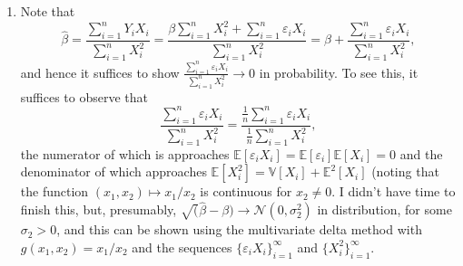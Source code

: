\documentclass[11pt]{article}
\newcommand{\E}{\mathbb{E}} %
\newcommand{\Var}{\mathbb{V}} %
\newcommand{\e}{\varepsilon} %
\begin{document}
\begin{enumerate}
\item Note that
\[\hat\beta
    = \frac{\sum_{i = 1}^n Y_iX_i}{\sum_{i = 1}^n X_i^2}
    = \frac{\beta\sum_{i = 1}^n X_i^2 + \sum_{i = 1}^n \e_iX_i}
                    {\sum_{i = 1}^n X_i^2}
    = \beta + \frac{\sum_{i = 1}^n \e_i X_i}{\sum_{i = 1}^n X_i^2},
\]
and hence it suffices to show
$\frac{\sum_{i = 1}^n \e_i X_i}{\sum_{i = 1}^n X_i^2} \to 0$ in probability.
To see this, it suffices to observe that
\[\frac{\sum_{i = 1}^n \e_i X_i}{\sum_{i = 1}^n X_i^2}
    = \frac{\frac1n\sum_{i = 1}^n \e_i X_i}{\frac1n\sum_{i = 1}^n X_i^2},
\]
the numerator of which is approaches $\E[\e_iX_i] = \E[\e_i]\E[X_i] = 0$ and
the denominator of which approaches $\E[X_i^2] = \Var[X_i] + \E^2[X_i]$ (noting
that the function $(x_1,x_2) \mapsto x_1/x_2$ is continuous for $x_2 \neq 0$.
I didn't have time to finish this, but, presumably,
$\sqrt(\hat\beta - \beta) \to \mathcal{N}(0,\sigma_2^2)$ in distribution, for
some $\sigma_2 > 0$, and this can be shown using the multivariate delta method
with $g(x_1,x_2) = x_1/x_2$ and the sequences $\{\e_iX_i\}_{i = 1}^\infty$ and
$\{X_i^2\}_{i = 1}^\infty$.
\end{enumerate}
\end{document}
